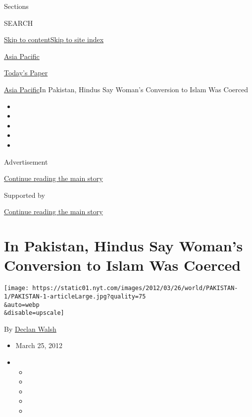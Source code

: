 Sections

SEARCH

\protect\hyperlink{site-content}{Skip to
content}\protect\hyperlink{site-index}{Skip to site index}

\href{https://www.nytimes.com/section/world/asia}{Asia Pacific}

\href{https://myaccount.nytimes.com/auth/login?response_type=cookie\&client_id=vi}{}

\href{https://www.nytimes.com/section/todayspaper}{Today's Paper}

\href{/section/world/asia}{Asia Pacific}\textbar{}In Pakistan, Hindus
Say Woman's Conversion to Islam Was Coerced

\begin{itemize}
\item
\item
\item
\item
\item
\end{itemize}

Advertisement

\protect\hyperlink{after-top}{Continue reading the main story}

Supported by

\protect\hyperlink{after-sponsor}{Continue reading the main story}

\hypertarget{in-pakistan-hindus-say-womans-conversion-to-islam-was-coerced}{%
\section{In Pakistan, Hindus Say Woman's Conversion to Islam Was
Coerced}\label{in-pakistan-hindus-say-womans-conversion-to-islam-was-coerced}}

\texttt{[image: https://static01.nyt.com/images/2012/03/26/world/PAKISTAN-1/PAKISTAN-1-articleLarge.jpg?quality=75\\\&auto=webp\\\&disable=upscale]}

By \href{https://www.nytimes.com/by/declan-walsh}{Declan Walsh}

\begin{itemize}
\item
  March 25, 2012
\item
  \begin{itemize}
  \item
  \item
  \item
  \item
  \item
  \end{itemize}
\end{itemize}

